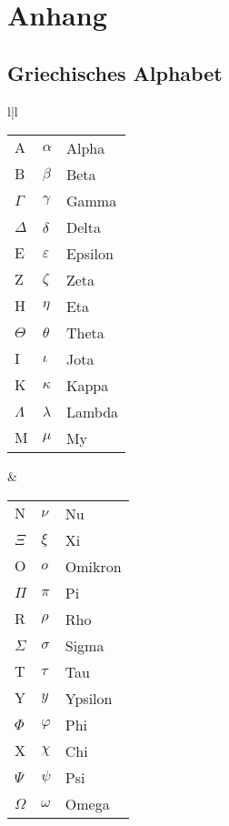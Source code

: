 \documentclass[a4paper,10pt,fleqn,onecolumn,twoside]{book}
\numberwithin{equation}{chapter}
\begin{document}
\chapter{Anhang}
\section{Griechisches Alphabet}

\begin{tabular}{l|l}
\begin{tabular}[t]{lll}
$\mathrm A$ & $\alpha$   & Alpha\\
$\mathrm B$ & $\beta$    & Beta\\
$\Gamma$    & $\gamma$   & Gamma\\
$\Delta$    & $\delta$   & Delta\\
\noalign{\vspace{1em}}
$\mathrm E$ & $\varepsilon$ & Epsilon\\
$\mathrm Z$ & $\zeta$    & Zeta\\
$\mathrm H$ & $\eta$     & Eta\\
$\Theta$    & $\theta$   & Theta\\
\noalign{\vspace{1em}}
$\mathrm I$ & $\iota$    & Jota\\
$\mathrm K$ & $\kappa$   & Kappa\\
$\Lambda$   & $\lambda$  & Lambda\\
$\mathrm M$ & $\mu$      & My
\end{tabular}
&
\begin{tabular}[t]{lll}
$\mathrm N$ & $\nu$      & Nu\\
$\Xi$       & $\xi$      & Xi\\
$\mathrm O$ & $o$        & Omikron\\
$\Pi$       & $\pi$      & Pi\\
\noalign{\vspace{1em}}
$\mathrm R$ & $\rho$     & Rho\\
$\Sigma$    & $\sigma$   & Sigma\\
$\mathrm T$ & $\tau$     & Tau\\
$\mathrm Y$ & $y$        & Ypsilon\\
\noalign{\vspace{1em}}
$\Phi$      & $\varphi$  & Phi\\
$\mathrm X$ & $\chi$     & Chi\\
$\Psi$      & $\psi$     & Psi\\
$\Omega$    & $\omega$   & Omega 
\end{tabular}
\end{tabular}
\end{document}
